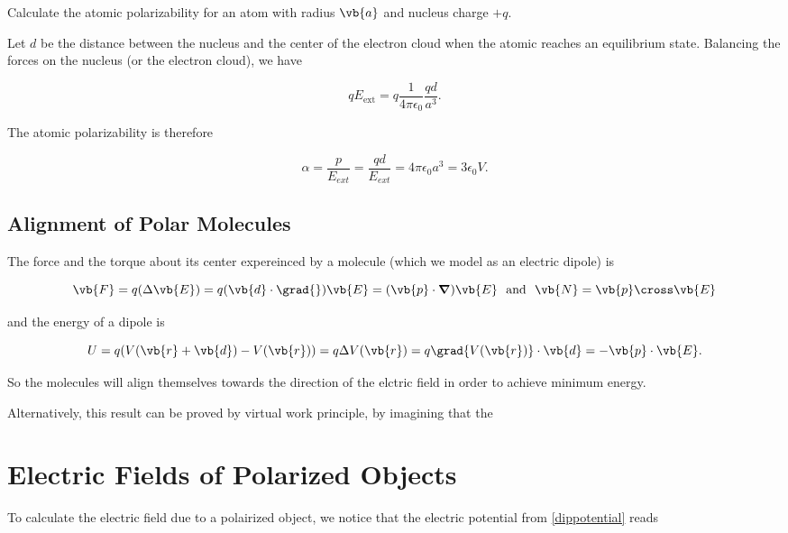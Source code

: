 \documentclass[english,a4paper,12pt]{report}
\begin{document}
{Calculate the atomic polarizability for an atom with radius \(\vb{a} \) and nucleus charge \(+q\).}
{Let \(d\) be the distance between the nucleus and the center of the electron cloud when the atomic reaches an equilibrium state. Balancing the forces on the nucleus (or the electron cloud), we have

\begin{equation}
    qE_{\text{ext} }  = q \frac{1}{4\pi \epsilon_0} \frac{qd}{a^3 }.
\end{equation}

The atomic polarizability is therefore 

\begin{equation}
    \alpha = \frac{p}{E_{ext} } =  \frac{qd}{E_{ext} } = 4\pi \epsilon _0 a^3 = 3\epsilon _0 V. 
\end{equation}
} 

\subsection{Alignment of Polar Molecules} \label{alignpolar} 

The force and the torque about its center expereinced by a molecule (which we model as an electric dipole) is 

\begin{equation}
    \vb{F} = q(\Delta \vb{E} ) = q (\vb{d} \cdot \grad{} )\vb{E}  = (\vb{p}  \cdot \boldsymbol{\nabla }) \vb{E} ~\text { and }~ \vb{N} = \vb{p} \cross \vb{E}
\end{equation}

and the energy of a dipole is 

\begin{equation}
    U = q(V(\vb{r} + \vb{d} ) - V(\vb{r} )) = q\Delta V(\vb{r} ) = q\grad{V(\vb{r} )}\cdot \vb{d} = - \vb{p} \cdot \vb{E}. 
\end{equation}

So the molecules will align themselves towards the direction of the elctric field in order to achieve minimum energy. 

Alternatively, this result can be proved by virtual work principle, by imagining that the 

\section{Electric Fields of Polarized Objects}

To calculate the electric field due to a polairized object, we notice that the electric potential from \cref{dippotential} reads
\end{document}
